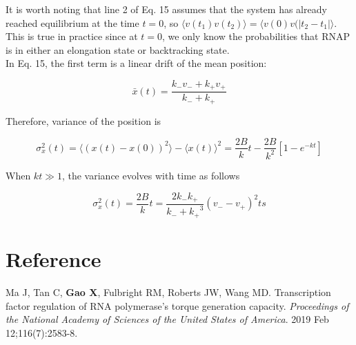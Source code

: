 \documentclass{article}
\begin{document}
It is worth noting that line 2 of Eq. 15 assumes that the system has already reached
equilibrium at the time $t=0$, so $\langle v(t_1)v(t_2)\rangle = \langle v(0) v(\left| t_2 - t_1 \right|\rangle$. This is true in practice since at $t=0$, we only know the probabilities that RNAP is in either an elongation state or backtracking state. \\
In Eq. 15, the first term is a linear drift of the mean position:

\begin{equation}
    \bar{x}(t)=\frac{k_- v_- + k_+ v_+}{k_- + k_+}
\end{equation} 

Therefore, variance of the position is

\begin{equation}
    \sigma_x^2(t)=\langle ( x(t) - x(0))^2 \rangle - \langle x(t) \rangle ^2 
    = \frac{2B}{k}t - \frac{2B}{k^2}[1-e^{-kt}]
\end{equation}

When $kt\gg1$, the variance evolves with time as follows

\begin{equation}
    \sigma_x^2(t)=\frac{2B}{k}t
    = \frac{2k_- k_+}{{k_- + k_+}^3}(v_- - v_+)^2ts
\end{equation}

\section*{Reference}
Ma J, Tan C, \textbf{Gao X}, Fulbright RM, Roberts JW, Wang MD. Transcription factor regulation of RNA polymerase’s torque generation capacity. \emph{Proceedings of the National Academy of Sciences of the United States of America}. 2019 Feb 12;116(7):2583-8. 
\end{document}
